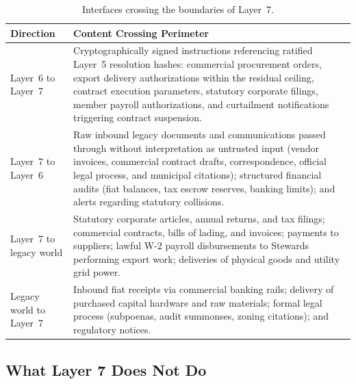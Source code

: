 \begin{table}[htbp]
\centering
\small
\begin{tabular}{|p{}|p{}|}
\hline
\textbf{Direction} & \textbf{Content Crossing Perimeter} \\
\hline
Layer~6 to Layer~7 & Cryptographically signed instructions referencing ratified Layer~5 resolution hashes: commercial procurement orders, export delivery authorizations within the residual ceiling, contract execution parameters, statutory corporate filings, member payroll authorizations, and curtailment notifications triggering contract suspension. \\
\hline
Layer~7 to Layer~6 & Raw inbound legacy documents and communications passed through without interpretation as untrusted input (vendor invoices, commercial contract drafts, correspondence, official legal process, and municipal citations); structured financial audits (fiat balances, tax escrow reserves, banking limits); and alerts regarding statutory collisions. \\
\hline
Layer~7 to legacy world & Statutory corporate articles, annual returns, and tax filings; commercial contracts, bills of lading, and invoices; payments to suppliers; lawful W-2 payroll disbursements to Stewards performing export work; deliveries of physical goods and utility grid power. \\
\hline
Legacy world to Layer~7 & Inbound fiat receipts via commercial banking rails; delivery of purchased capital hardware and raw materials; formal legal process (subpoenas, audit summonses, zoning citations); and regulatory notices. \\
\hline
\end{tabular}
\caption{Interfaces crossing the boundaries of Layer~7.}
\label{tab:l7-interfaces}
\end{table}

\subsection{What Layer 7 Does Not Do}

